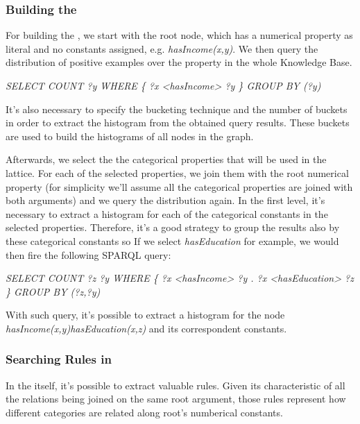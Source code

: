 \subsubsection{Building the \graphname}

For building the \graphname, we start with the root node, which has a numerical property as literal and no constants assigned, e.g. \emph{hasIncome(x,y)}. We then query the  distribution of positive examples over the property in the whole Knowledge Base.

\begin{center}
 \emph{SELECT COUNT ?y WHERE \{ ?x <hasIncome> ?y \} GROUP BY (?y)}
\end{center}

It's also necessary to specify the bucketing technique and the number of buckets in order to extract the histogram from the obtained query results. These buckets are used to build the histograms of all nodes in the graph.

Afterwards, we select the the categorical properties that will be used in the lattice. For each of the selected properties, we join them with the root numerical property (for simplicity we'll assume all the categorical properties are joined with both  arguments) and we query the distribution again. In the first level, it's necessary to extract a histogram for each of the categorical constants in the selected properties. Therefore, it's a good strategy to group the results also by these categorical constants so If we select \emph{hasEducation} for example, we would then fire the following SPARQL query:

\begin{center}
 \emph{SELECT COUNT ?z ?y WHERE \{ ?x <hasIncome> ?y . ?x <hasEducation> ?z \} GROUP BY (?z,?y)}
\end{center}

With such query, it's possible to extract a histogram for the node \emph{hasIncome(x,y)hasEducation(x,z)} and its correspondent constants. 

\subsubsection{Searching Rules in \graphname}

In the \graphname itself, it's possible to extract valuable rules. Given its characteristic of all the relations being joined on the same root argument, those rules represent how different categories are related along root's numberical constants.


